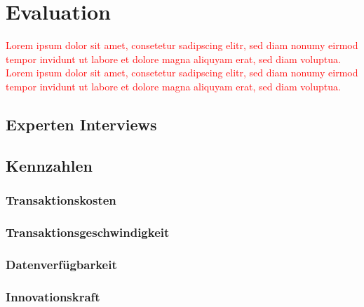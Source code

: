 \section{Evaluation}
\textcolor{red}{Lorem ipsum dolor sit amet, consetetur sadipscing elitr, sed diam nonumy eirmod tempor invidunt ut labore et dolore magna aliquyam erat, sed diam voluptua. Lorem ipsum dolor sit amet, consetetur sadipscing elitr, sed diam nonumy eirmod tempor invidunt ut labore et dolore magna aliquyam erat, sed diam voluptua.}

\subsection{Experten Interviews}

\subsection{Kennzahlen}

\subsubsection{Transaktionskosten}

\subsubsection{Transaktionsgeschwindigkeit}

\subsubsection{Datenverfügbarkeit}

\subsubsection{Innovationskraft}


\newpage
